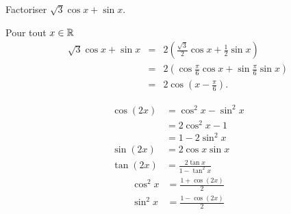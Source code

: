 \documentclass{magnolia}
\begin{document}
\begin{exoUnique}
\exo Factoriser $\sqrt{3}\cos x+\sin x$.
\begin{sol}
Pour tout $x\in\mathbb{R}$
\begin{eqnarray*}
\sqrt{3}\cos x+\sin x
&=& 2\left(\frac{\sqrt{3}}{2}\cos x+\frac{1}{2}\sin x \right)\\
&=& 2\left( \cos \frac{\pi}{6}\cos x+\sin \frac{\pi}{6}\sin x \right)\\
&=& 2\cos\left( x-\frac{\pi}{6}\right).
\end{eqnarray*}
\end{sol}
\end{exoUnique}

\begin{proposition}[utile=-3, nom={Angle double}]
\begin{align*}
\cos(2x)&=\cos^2 x-\sin^2 x\\
        &=2\cos^2 x-1\\
        &=1-2\sin^2 x\\
\sin(2x)&=2\cos x\sin x\\
\tan(2x)&=\frac{2\tan x}{1-\tan^2 x}
\end{align*}
\begin{align*}
\cos^2 x &=\frac{1+\cos(2x)}{2}\\
\sin^2 x &=\frac{1-\cos(2x)}{2}
\end{align*}
\end{proposition}
\end{document}

